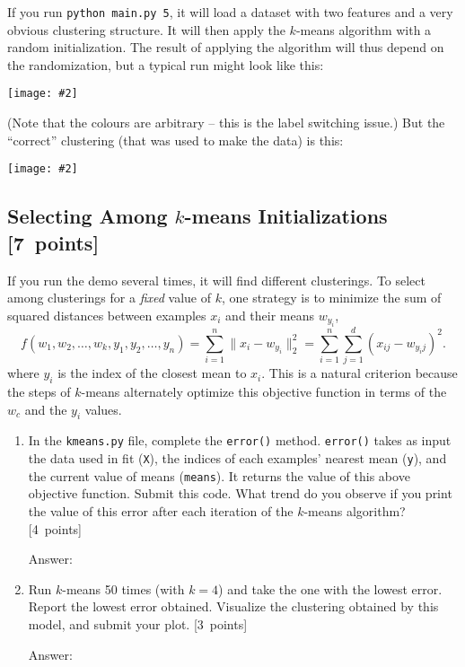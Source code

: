 \documentclass{article}
\newcommand{\blu}[1]{{\textcolor{blu}{#1}}}
\newenvironment{answer}{\par\begingroup\color{gre}Answer: }{\endgroup}
\let\ask\blu
\newcommand\pts[1]{\textcolor{pointscolour}{[#1~points]}}
\newcommand{\norm}[1]{\lVert #1 \rVert}
\newcommand{\centerfig}[2]{\begin{center}\texttt{[image: \#2]}\end{center}}
\begin{document}
    If you run \verb|python main.py 5|, it will load a dataset with two features
    and a very obvious clustering structure. It will then apply the $k$-means algorithm
    with a random initialization. The result of applying the
    algorithm will thus depend on the randomization, but a typical run might look like this:
    \centerfig{.5}{figs/kmeans_basic.png}
    (Note that the colours are arbitrary -- this is the label switching issue.)
    But the ``correct'' clustering (that was used to make the data) is this:
    \centerfig{.5}{figs/kmeans_good.png}


    \clearpage
    \subsection{Selecting Among $k$-means Initializations \pts{7}}

    If you run the demo several times, it will find different clusterings. To select among clusterings for a \emph{fixed} value of $k$, one strategy is to minimize the sum of squared distances between examples $x_i$ and their means $w_{y_i}$,
    \[
    f(w_1,w_2,\dots,w_k,y_1,y_2,\dots,y_n) = \sum_{i=1}^n \norm{x_i - w_{y_i}}_2^2 = \sum_{i=1}^n \sum_{j=1}^d (x_{ij} - w_{y_ij})^2.
    \]
    where $y_i$ is the index of the closest mean to $x_i$. This is a natural criterion because the steps of $k$-means alternately optimize this objective function in terms of the $w_c$ and the $y_i$ values.

    \begin{enumerate}
        \item In the \texttt{kmeans.py} file, complete the \texttt{error()} method. \texttt{error()} takes as input the data used in fit (\texttt{X}), the indices of each examples' nearest mean (\texttt{y}), and the current value of means (\texttt{means}). It returns the value of this above objective function. \ask{Submit this code. What trend do you observe if you print the value of this error after each iteration of the $k$-means algorithm?} \pts{4}
        \begin{answer}

        \end{answer}
        \item Run $k$-means 50 times (with $k=4$) and take the one with the lowest error. \ask{Report the lowest error obtained.} Visualize the clustering obtained by this model, and \ask{submit your plot}. \pts{3}
        \begin{answer}

        \end{answer}
    \end{enumerate}
\end{document}
